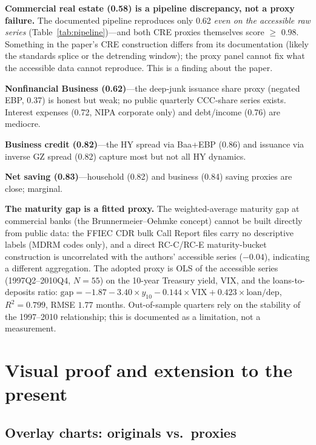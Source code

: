 \documentclass[11pt]{article}
\begin{document}
\textbf{Commercial real estate (0.58) is a pipeline discrepancy, not a
proxy failure.}  The documented pipeline reproduces only 0.62
\textit{even on the accessible raw series} (Table~\ref{tab:pipeline})---and
both CRE proxies themselves score $\ge$ 0.98.  Something in the paper's
CRE construction differs from its documentation (likely the standards
splice or the detrending window); the proxy panel cannot fix what the
accessible data cannot reproduce.  This is a finding about the paper.

\textbf{Nonfinancial Business (0.62)}---the deep-junk issuance share
proxy (negated EBP, 0.37) is honest but weak; no public quarterly
CCC-share series exists.  Interest expenses (0.72, NIPA corporate only)
and debt/income (0.76) are mediocre.

\textbf{Business credit (0.82)}---the HY spread via Baa+EBP (0.86) and
issuance via inverse GZ spread (0.82) capture most but not all HY
dynamics.

\textbf{Net saving (0.83)}---household (0.82) and business (0.84) saving
proxies are close; marginal.

\textbf{The maturity gap is a fitted proxy.}  The weighted-average
maturity gap at commercial banks (the Brunnermeier--Oehmke concept) cannot
be built directly from public data: the FFIEC CDR bulk Call Report files
carry no descriptive labels (MDRM codes only), and a direct RC-C/RC-E
maturity-bucket construction is uncorrelated with the authors' accessible
series ($-0.04$), indicating a different aggregation.  The adopted proxy is
OLS of the accessible series (1997Q2--2010Q4, $N=55$) on the 10-year
Treasury yield, VIX, and the loans-to-deposits ratio:
$\text{gap} = -1.87 - 3.40\times y_{10} - 0.144\times \text{VIX}
+ 0.423\times \text{loan/dep}$, $R^2=0.799$, RMSE $1.77$ months.
Out-of-sample quarters rely on the stability of the 1997--2010
relationship; this is documented as a limitation, not a measurement.

\section{Visual proof and extension to the present}
\label{sec:visual}

\subsection{Overlay charts: originals vs.\ proxies}
\end{document}
